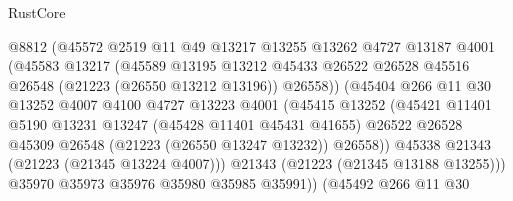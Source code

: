 \begin{lexlean}{RustCore}
\begin{coremodule}
                              @8812
                              (@45572
                                @2519
                                @11
                                @49
                                @13217
                                @13255
                                @13262
                                @4727
                                @13187
                                @4001
                                (@45583
                                  @13217
                                  (@45589
                                    @13195
                                    @13212
                                    @45433
                                    @26522
                                    @26528
                                    @45516
                                    @26548
                                    (@21223 (@26550 @13212 @13196))
                                    @26558))
                                (@45404
                                  @266
                                  @11
                                  @30
                                  @13252
                                  @4007
                                  @4100
                                  @4727
                                  @13223
                                  @4001
                                  (@45415
                                    @13252
                                    (@45421
                                      @11401
                                      @5190
                                      @13231
                                      @13247
                                      (@45428 @11401 @45431 @41655)
                                      @26522
                                      @26528
                                      @45309
                                      @26548
                                      (@21223 (@26550 @13247 @13232))
                                      @26558))
                                  @45338
                                  @21343
                                  (@21223 (@21345 @13224 @4007)))
                                @21343
                                (@21223 (@21345 @13188 @13255)))
                              @35970
                              @35973
                              @35976
                              @35980
                              @35985
                              @35991))
                          (@45492
                            @266
                            @11
                            @30

\end{coremodule}
\end{lexlean}
